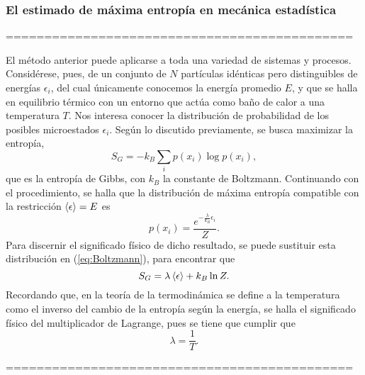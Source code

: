 \subsubsection{El estimado de máxima entropía en mecánica estadística}


=============================================

El método anterior puede aplicarse a toda una variedad de sistemas y procesos. Considérese, pues, de un conjunto de $N$ partículas idénticas pero distinguibles de energías $\epsilon_{i}$, del cual únicamente conocemos la energía promedio $E$, y que se halla en equilibrio térmico con un entorno que actúa como baño de calor a una temperatura $T$. Nos interesa conocer la distribución de probabilidad de los posibles microestados $\epsilon_{i}$. Según lo discutido previamente, se busca maximizar la entropía,
\begin{equation}\label{eq:GibbsEntropy}
    S_{G}=-k_{B}\sum_{i}p(x_{i})\log{p(x_{i})},
\end{equation}
que es la entropía de Gibbs, con $k_{B}$ la constante de Boltzmann. Continuando con el procedimiento, se halla que la distribución de máxima entropía compatible con la restricción $\expval{\epsilon}=E$ es
\begin{equation}\label{eq:Boltzmann}
    p(x_{i})=\frac{e^{-\frac{\lambda}{k_{B}}\epsilon_{i}}}{Z}.
\end{equation}
Para discernir el significado físico de dicho resultado, se puede sustituir esta distribución en (\ref{eq:Boltzmann}), para encontrar que
\begin{equation}
    S_{G}=\lambda\expval{\epsilon}+k_{B}\ln{Z}.
\end{equation}
Recordando que, en la teoría de la termodinámica se define a la temperatura como el inverso del cambio de la entropía según la energía, se halla el significado físico del multiplicador de Lagrange, pues se tiene que cumplir que
\begin{equation*}
    \lambda=\frac{1}{T}.
\end{equation*}

=============================================

